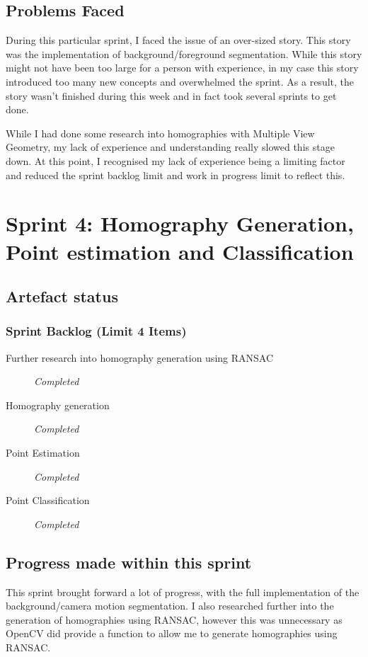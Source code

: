 \subsection{Problems Faced}
During this particular sprint, I faced the issue of an over-sized story. This story was the implementation of background/foreground segmentation. While this story might not have been too large for a person with experience, in my case this story introduced too many new concepts and overwhelmed the sprint. As a result, the story wasn't finished during this week and in fact took several sprints to get done.

While I had done some research into homographies with Multiple View Geometry\cite{MultipleViewGeometry}, my lack of experience and understanding really slowed this stage down. At this point, I recognised my lack of experience being a limiting factor and reduced the sprint backlog limit and work in progress limit to reflect this.
\clearpage
\section{Sprint 4: Homography Generation, Point estimation and Classification}
\subsection{Artefact status}
\subsubsection{Sprint Backlog (Limit 4 Items)}
\begin{description}
  \item[Further research into homography generation using RANSAC] \em{Completed}
  \item[Homography generation] \em{Completed}
  \item[Point Estimation] \em{Completed}
  \item[Point Classification] \em{Completed}
\end{description}
\subsection{Progress made within this sprint}
This sprint brought forward a lot of progress, with the full implementation of the background/camera motion segmentation. I also researched further into the generation of homographies using RANSAC, however this was unnecessary as OpenCV did provide a function to allow me to generate homographies using RANSAC.

